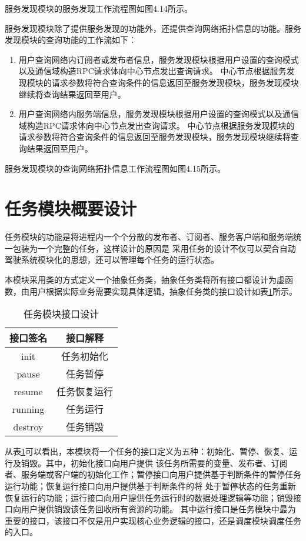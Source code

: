 服务发现模块的服务发现工作流程图如图4.14所示。

服务发现模块除了提供服务发现的功能外，还提供查询网络拓扑信息的功能。服务发现模块的查询功能的工作流如下：
\begin{enumerate}
  \item 用户查询网络内订阅者或发布者信息，服务发现模块根据用户设置的查询模式以及通信域构造RPC请求体向中心节点发出查询请求。
  中心节点根据服务发现模块的请求参数将符合查询条件的信息返回至服务发现模块，服务发现模块继续将查询结果返回至用户。
  \item 用户查询网络内服务端信息，服务发现模块根据用户设置的查询模式以及通信域构造RPC请求体向中心节点发出查询请求。
  中心节点根据服务发现模块的请求参数将符合查询条件的信息返回至服务发现模块，服务发现模块继续将查询结果返回至用户。
\end{enumerate}

服务发现模块的查询网络拓扑信息工作流程图如图4.15所示。

\section{任务模块概要设计}
任务模块的功能是将进程内一个个分散的发布者、订阅者、服务客户端和服务端统一包装为一个完整的任务，这样设计的原因是
采用任务的设计不仅可以契合自动驾驶系统模块化的思想，还可以管理每个任务的运行状态。

本模块采用类的方式定义一个抽象任务类，抽象任务类将所有接口都设计为虚函数，由用户根据实际业务需要实现具体逻辑，抽象任务类的接口设计如表\ref{task_jiekou}所示。
\begin{table}[htb]
  \centering\small
  \caption{任务模块接口设计}
  \label{task_jiekou}
  \begin{tabular}{cc}
    \toprule
    接口签名 & 接口解释 \\
    \midrule
    init & 任务初始化 \\
    pause & 任务暂停\\
    resume & 任务恢复运行\\
    running & 任务运行\\
    destroy & 任务销毁\\
    \bottomrule
  \end{tabular}
\end{table}

从表\ref{task_jiekou}可以看出，本模块将一个任务的接口定义为五种：初始化、暂停、恢复、运行及销毁。其中，初始化接口向用户提供
该任务所需要的变量、发布者、订阅者、服务端或客户端的初始化工作；暂停接口向用户提供基于判断条件的暂停任务运行功能；恢复运行接口向用户提供基于判断条件的将
处于暂停状态的任务重新恢复运行的功能；运行接口向用户提供任务运行时的数据处理逻辑等功能；销毁接口向用户提供销毁该任务回收所有资源的功能。
其中运行接口是任务模块中最为重要的接口，该接口不仅是用户实现核心业务逻辑的接口，还是调度模块调度任务的入口。

